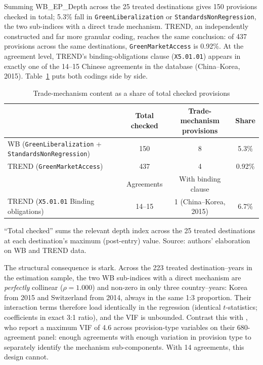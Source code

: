 \documentclass[12pt]{article}
\begin{document}
Summing WB\_EP\_Depth across the 25 treated destinations gives 150 provisions checked in
total; 5.3\% fall in \texttt{GreenLiberalization} or \texttt{StandardsNonRegression},
the two sub-indices with a direct trade mechanism. TREND, an independently constructed
and far more granular coding, reaches the same conclusion: of 437 provisions across the
same destinations, \texttt{GreenMarketAccess} is 0.92\%. At the agreement level, TREND's
binding-obligations clause (\texttt{X5.01.01}) appears in exactly one of the 14--15
Chinese agreements in the database (China--Korea, 2015). Table~\ref{tab:mechanism} puts
both codings side by side.

\begin{table}[htbp]
\centering
\caption{Trade-mechanism content as a share of total checked provisions}
\label{tab:mechanism}
\small
\begin{threeparttable}
\begin{tabular}{lccc}
\toprule
 & Total checked & Trade-mechanism provisions & Share \\
\midrule
WB (\texttt{GreenLiberalization} + \texttt{StandardsNonRegression}) & 150 & 8 & 5.3\% \\
TREND (\texttt{GreenMarketAccess}) & 437 & 4 & 0.92\% \\
\midrule
 & Agreements & With binding clause & \\
\midrule
TREND (\texttt{X5.01.01} Binding obligations) & 14--15 & 1 (China--Korea, 2015) & 6.7\% \\
\bottomrule
\end{tabular}
\begin{tablenotes}\footnotesize
\item ``Total checked'' sums the relevant depth index across the 25 treated destinations
at each destination's maximum (post-entry) value. Source: authors' elaboration on WB and TREND data.
\end{tablenotes}
\end{threeparttable}
\end{table}

The structural consequence is stark. Across the 223 treated destination--years in the
estimation sample, the two WB sub-indices with a direct mechanism are \emph{perfectly}
collinear ($\rho = 1.000$) and non-zero in only three country--years: Korea from 2015
and Switzerland from 2014, always in the same 1:3 proportion. Their interaction terms
therefore load identically in the regression (identical $t$-statistics; coefficients in
exact 3:1 ratio), and the VIF is unbounded. Contrast this with \citet{brandi2020}, who
report a maximum VIF of 4.6 across provision-type variables on their 680-agreement panel:
enough agreements with enough variation in provision type to separately identify the
mechanism sub-components. With 14 agreements, this design cannot.
\end{document}
